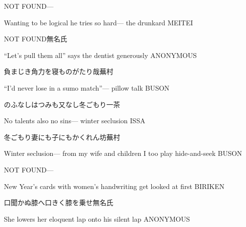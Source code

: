 \begin{haiku}
   NOT FOUND\hfill{---}

    \vin{} Wanting to be logical
    \vin{} \vin{} he tries so hard---
    \vin{} \vin{} \vin{} the drunkard \hspace{\fill} MEITEI
\end{haiku}

\begin{haiku}
    NOT FOUND\hfill{\FH 無名氏}

    \vin{} ``Let's pull them all''
    \vin{} \vin{} says the dentist
    \vin{} \vin{} \vin{} generously \hspace{\fill} ANONYMOUS
\end{haiku}

\begin{haiku}
    {\FH 負まじき角力を寝ものがたり哉}\hfill{\FH 蕪村}

    \vin{} ``I'd never lose
    \vin{} \vin{} in a sumo match''---
    \vin{} \vin{} \vin{} pillow talk \hspace{\fill} BUSON
\end{haiku}

\begin{haiku}
    {\FH のふなしはつみも又なし冬ごもり}\hfill{\FH 一茶}

    \vin{} No talents
    \vin{} \vin{} also no sins---
    \vin{} \vin{} \vin{} winter seclusion \hspace{\fill} ISSA
\end{haiku}

\begin{haiku}
    {\FH 冬ごもり妻にも子にもかくれん坊}\hfill{\FH 蕪村}

    \vin{} Winter seclusion---
    \vin{} \vin{} from my wife and children
    \vin{} \vin{} \vin{} I too play hide-and-seek \hspace{\fill} BUSON
\end{haiku}

\begin{haiku}
   NOT FOUND\hfill{---}

    \vin{} New Year's cards
    \vin{} \vin{} with women's handwriting
    \vin{} \vin{} \vin{} get looked at first \hspace{\fill} BIRIKEN
\end{haiku}

\begin{haiku}
    {口聞かぬ膝へ口きく膝を乗せ}\hfill{\FH 無名氏}

    \vin{} She lowers
    \vin{} \vin{} her eloquent lap
    \vin{} \vin{} \vin{} onto his silent lap \hspace{\fill} ANONYMOUS
\end{haiku}

